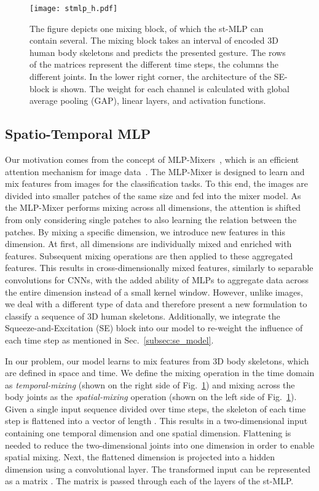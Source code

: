 \documentclass[letterpaper, 10 pt, conference]{ieeeconf}
\begin{document}
\begin{figure}[!ht]
\vspace{2mm}
    \centering
    \texttt{[image: stmlp\_h.pdf]}
    \caption{The figure depicts one mixing block, of which the st-MLP can contain several. The mixing block takes an interval of encoded 3D human body skeletons and predicts the presented gesture. The rows of the matrices represent the different time steps, the columns the different joints. In the lower right corner, the architecture of the SE-block is shown. The weight for each channel is calculated with global average pooling (GAP), linear layers, and activation functions.}
    \label{fig:st_mlp}
\end{figure}


\subsection{Spatio-Temporal MLP}
\label{subsec:mlp_gesture_recognition}

Our motivation comes from the concept of MLP-Mixers~\cite{tolstikhin2021mlp}, which is an efficient attention mechanism for image data~\cite{vaswani2017attention, dosovitskiy2020image}. The MLP-Mixer is designed to learn and mix features from images for the classification tasks. To this end, the images are divided into smaller patches of the same size and fed into the mixer model. As the MLP-Mixer performs mixing across all dimensions, the attention is shifted from only considering single patches to also learning the relation between the patches. By mixing a specific dimension, we introduce new features in this dimension. At first, all dimensions are individually mixed and enriched with features. Subsequent mixing operations are then applied to these aggregated features. This results in cross-dimensionally mixed features, similarly to separable convolutions for CNNs, with the added ability of MLPs to aggregate data across the entire dimension instead of a small kernel window. However, unlike images, we deal with a different type of data and therefore present a new formulation to classify a sequence of 3D human skeletons. Additionally, we integrate the Squeeze-and-Excitation (SE) block into our model to re-weight the influence of each time step as mentioned in Sec.~\ref{subsec:se_model}.

In our problem, our model learns to mix features from 3D body skeletons, which are defined in space and time. We define the mixing operation in the time domain as \textit{temporal-mixing} (shown on the right side of Fig.~\ref{fig:st_mlp}) and mixing across the body joints as the \textit{spatial-mixing} operation (shown on the left side of Fig.~\ref{fig:st_mlp}). Given a single input sequence  divided over  time steps, the skeleton of each time step  is flattened into a vector of length . This results in a two-dimensional input  containing one temporal dimension and one spatial dimension. Flattening is needed to reduce the two-dimensional joints into one dimension in order to enable spatial mixing. Next, the flattened dimension  is projected into a hidden dimension  using a convolutional layer. The transformed input can be represented as a matrix . The matrix is passed through each of the  layers of the st-MLP.
\end{document}
